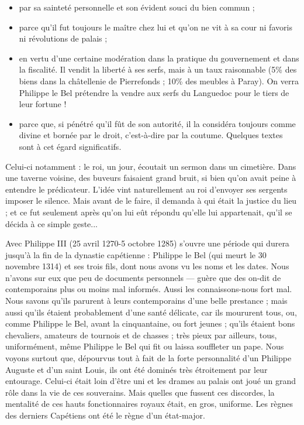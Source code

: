 \documentclass[french,twoside]{book} %
\begin{document}
\begin{itemize}[itemsep=0pt,]
\item par sa sainteté personnelle et son évident souci du bien commun ;
\item parce qu’il fut toujours le maître chez lui et qu’on ne vit à sa cour ni favoris ni révolutions de palais ;
\item en vertu d’une certaine modération dans la pratique du gouvernement et dans la fiscalité. Il vendit la liberté à ses serfs, mais à un taux raisonnable (5\% des biens dans la châtellenie de Pierrefonds ; 10\% des meubles à Paray). On verra Philippe le Bel prétendre la vendre aux serfs du Languedoc pour le tiers de leur fortune !
\item parce que, si pénétré qu’il fût de son autorité, il la considéra toujours comme divine et bornée par le droit, c’est-à-dire par la coutume. Quelques textes sont à cet égard significatifs.
\end{itemize}
\noindent Celui-ci notamment : le roi, un jour, écoutait un sermon dans un cimetière. Dans une taverne voisine, des buveurs faisaient grand bruit, si bien qu’on avait peine à  
\label{p16} entendre le prédicateur. L’idée vint naturellement au roi d’envoyer ses sergents imposer le silence. Mais avant de le faire, il demanda à qui était la justice du lieu ; et ce fut seulement après qu’on lui eût répondu qu’elle lui appartenait, qu’il se décida à ce simple geste...\par
Avec Philippe III (25 avril 1270-5 octobre 1285) s’ouvre une période qui durera jusqu’à la fin de la dynastie capétienne : Philippe le Bel (qui meurt le 30 novembre 1314) et ses trois fils, dont nous avons vu les noms et les dates. Nous n’avons sur eux que peu de documents personnels — guère que des on-dit de contemporains plus ou moins mal informés. Aussi les connaissons-nous fort mal. Nous savons qu’ils parurent à leurs contemporains d’une belle prestance ; mais aussi qu’ils étaient probablement d’une santé délicate, car ils moururent tous, ou, comme Philippe le Bel, avant la cinquantaine, ou fort jeunes ; qu’ils étaient bons chevaliers, amateurs de tournois et de chasses ; très pieux par ailleurs, tous, uniformément, même Philippe le Bel qui fit ou laissa souffleter un pape. Nous voyons surtout que, dépourvus tout à fait de la forte personnalité d’un Philippe Auguste et d’un saint Louis, ils ont été dominés très étroitement par leur entourage. Celui-ci était loin d’être uni et les drames au palais ont joué un grand rôle dans la vie de ces souverains. Mais quelles que fussent ces discordes, la mentalité de ces hauts fonctionnaires royaux était, en gros, uniforme. Les règnes des derniers Capétiens ont été le règne d’un état-major.\par
\end{document}
